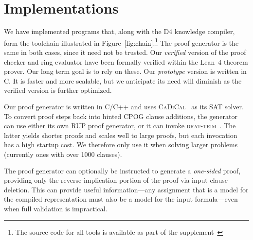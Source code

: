 \documentclass[letterpaper,USenglish,cleveref, autoref, thm-restate]{lipics-v2021}
\newcommand{\progname}[1]{\textsc{#1}}
\newcommand{\dfour}{\progname{D4}}
\newcommand{\cadical}{\progname{CaDiCal}}
\newcommand{\dtrim}{\progname{drat-trim}}
\newcommand{\lean}{Lean~4}
\begin{document}
\section{Implementations}
We have implemented programs that, along with
the \dfour{} knowledge compiler, form the toolchain illustrated in
Figure~\ref{fig:chain}.\footnote{The source code for all tools
is available as part of the supplement~\cite{bryant:sat:2023:supplement}}  The proof generator is the same in both
cases, since it need not be trusted.
Our \emph{verified}
version of the proof checker and ring evaluator have been formally
verified within the \lean{} theorem prover.  Our long term goal is to
rely on these.  Our \emph{prototype} version is written in C\@.
It is faster and
more scalable, but we anticipate its need will diminish as the
verified version is further optimized.

Our proof generator is written in C/C++ and uses
\cadical{}~\cite{biere-cadical-2019} as its SAT solver.  To convert
proof steps back into hinted CPOG clause additions, the generator can
use either its own RUP proof generator, or it can invoke
\dtrim{}~\cite{heule:cade:2013}.  The latter yields shorter proofs and scales well
to large proofs, but each invocation has a high startup cost.  We
therefore only use it when solving larger problems (currently ones
with over 1000 clauses).

The proof generator can optionally be instructed to generate a {\em
one-sided} proof, providing only the reverse-implication portion of the proof via
input clause deletion.  This can provide useful information---any
assignment that is a model for the compiled representation
must also be a model for the input formula---even when
full validation is impractical.
\end{document}
